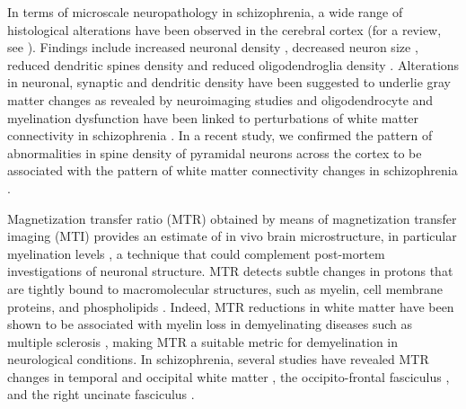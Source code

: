 \begin{refsection}
In terms of microscale neuropathology in schizophrenia, a wide range of histological alterations have been observed in the cerebral cortex (for a review, see \citep{Bakhshi2015TheNO}). Findings include increased neuronal density \citep{DorphPetersen2009PyramidalNN,Selemon1995AbnormallyHN,Selemon1998ElevatedND,Yang2011IncreasedIW}, decreased neuron size \citep{Chana2003TwodimensionalAO,Rajkowska1998NeuronalAG}, reduced dendritic spines density \citep{Garey1998ReducedDS,Glantz2000DecreasedDS,Glausier2013DendriticSP,Penzes2011DendriticSP} and reduced oligodendroglia density \citep{Uranova2004OligodendroglialDI,Uranova2001ElectronMO,Vostrikov2013ReducedOD}. Alterations in neuronal, synaptic and dendritic density have been suggested to underlie gray matter changes as revealed by neuroimaging studies \citep{Fornito2009AnatomicalAO,Fornito2009ReconcilingNA} and oligodendrocyte and myelination dysfunction have been linked to perturbations of white matter connectivity in schizophrenia \citep{Cassoli2015DisturbedMI}. In a recent study, we confirmed the pattern of abnormalities in spine density of pyramidal neurons across the cortex to be associated with the pattern of white matter connectivity changes in schizophrenia \citep{VANDENHEUVEL2016293}.

Magnetization transfer ratio (MTR) obtained by means of magnetization transfer imaging (MTI) provides an estimate of in vivo brain microstructure, in particular myelination levels \citep{Whitaker2016AdolescenceIA}, a technique that could complement post-mortem investigations of neuronal structure. MTR detects subtle changes in protons that are tightly bound to macromolecular structures, such as myelin, cell membrane proteins, and phospholipids \citep{wolff1994magnetization}. Indeed, MTR reductions in white matter have been shown to be associated with myelin loss in demyelinating diseases such as multiple sclerosis \citep{Chen2007VoxelbasedAO,Chen2008MagnetizationTR,Derakhshan2014SurfacebasedAR,Dousset1992ExperimentalAE,Schmierer2004MagnetizationTR,schmierer2007quantitative}, making MTR a suitable metric for demyelination in neurological conditions. In schizophrenia, several studies have revealed MTR changes in temporal \citep{Foong2000InVI} and occipital white matter \citep{Palaniyappan2013CombinedWM}, the occipito-frontal fasciculus \citep{Kubicki2005DTIAM}, and the right uncinate fasciculus \citep{Mandl2010TractbasedAO}.


\end{refsection}
